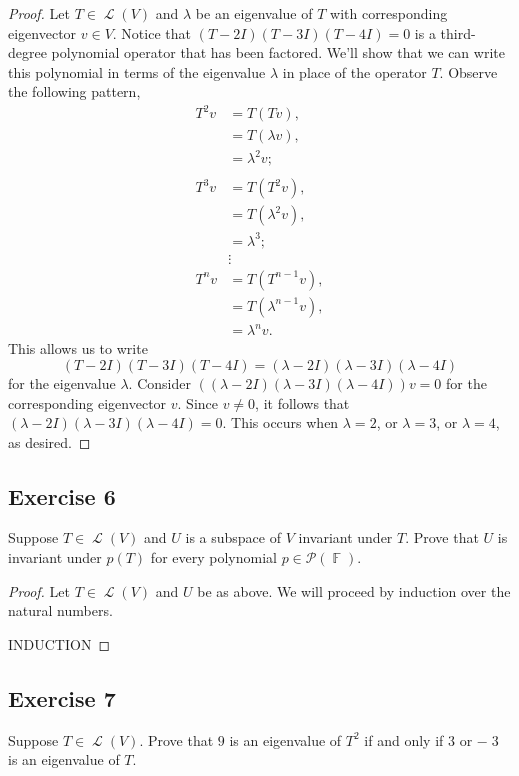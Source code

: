 \documentclass[letterpaper, 12pt]{amsart}
\DeclareMathOperator{\F}{\mathbb{F}}				%
\DeclareMathOperator{\Ell}{\mathscr{L}}				%
\theoremstyle{definition}  							%
\begin{document}
		\begin{proof}
		Let $T \in \Ell(V)$ and $\lambda$ be an eigenvalue of $T$ with corresponding eigenvector $v \in V$.
		Notice that $(T - 2I)(T - 3I)(T - 4I) = 0$ is a third-degree polynomial operator that has been factored.
		We'll show that we can write this polynomial in terms of the eigenvalue $\lambda$ in place of the operator $T$.
		Observe the following pattern,
			\begin{align*}
				T^{2}v &= T(Tv), \\
				&= T(\lambda v), \\
				&= \lambda^2 v; \\
				\\
				T^3v &= T(T^2v), \\
				&= T(\lambda^2v), \\
				&= \lambda^{3}; \\
				&\vdots \\
				T^nv &= T(T^{n-1}v), \\
				&= T(\lambda^{n-1}v), \\
				&= \lambda^{n}v.
			\end{align*}
		This allows us to write $$(T - 2I)(T - 3I)(T - 4I) = (\lambda - 2I)(\lambda - 3I)(\lambda - 4I)$$ for the eigenvalue $\lambda$.
		Consider $((\lambda - 2I)(\lambda - 3I)(\lambda - 4I))v = 0$ for the corresponding eigenvector $v$.
		Since $v \neq 0$, it follows that $(\lambda - 2I)(\lambda - 3I)(\lambda - 4I) = 0$.
		This occurs when $\lambda = 2$, or $\lambda = 3$, or $\lambda = 4$, as desired.
		\end{proof}

		\subsection*{Exercise 6}
		Suppose $T \in \Ell(V)$ and $U$ is a subspace of $V$ invariant under $T$. 
		Prove that $U$ is invariant under $p(T)$ for every polynomial $p \in \mathcal{P}(\F)$.

		\begin{proof}
		Let $T \in \Ell(V)$ and $U$ be as above.
		We will proceed by induction over the natural numbers.

		INDUCTION
		\end{proof}

		\subsection*{Exercise 7}
		Suppose $T \in \Ell(V)$. 
		Prove that $9$ is an eigenvalue of $T^2$ if and only if $3$ or $-􏰋3$ is an eigenvalue of $T$.
\end{document}
